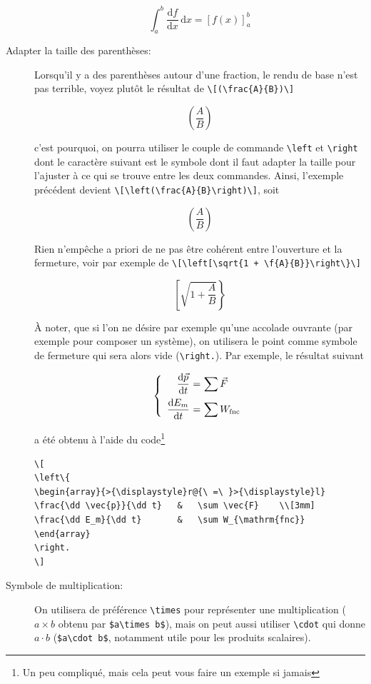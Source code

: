 \documentclass[12pt,a4paper]{article}
\newenvironment{code}{%
\begin{mdframed}[linecolor=Green,innerrightmargin=30pt,innerleftmargin=30pt,
backgroundcolor=Black!5,
skipabove=10pt,skipbelow=10pt,roundcorner=5pt,
splitbottomskip=6pt,splittopskip=12pt]
}{%
\end{mdframed}
}
\newcommand{\dd}{\text{d}}
\newcommand{\cmd}[1]{\texttt{\textbackslash#1}}
\begin{document}
\begin{description}
   \[
   \int_a^b \frac{\dd f}{\dd x}\,\dd x = [f(x)]_a^b
   \]
    
    \item[Adapter la taille des parenthèses:] Lorsqu'il y a des parenthèses autour d'une fraction, le rendu de base n'est pas terrible, voyez plutôt le résultat de \verb|\[(\frac{A}{B})\]|
    
    \[(\frac{A}{B})\]
    
    c'est pourquoi, on pourra utiliser le couple de commande \cmd{left} et \cmd{right} dont le caractère suivant est le symbole dont il faut adapter la taille pour l'ajuster à ce qui se trouve entre les deux commandes. Ainsi, l'exemple précédent devient \verb|\[\left(\frac{A}{B}\right)\]|, soit
    
      \[\left(\frac{A}{B}\right)\]
    
    Rien n'empêche a priori de ne pas être cohérent entre l'ouverture et la fermeture, voir par exemple de \verb|\[\left[\sqrt{1 + \f{A}{B}}\right\}\]|
    
    \[\left[\sqrt{1 + \frac{A}{B}}\right\}\]
    
    À noter, que si l'on ne désire par exemple qu'une accolade ouvrante (par exemple pour composer un système), on utilisera le point comme symbole de fermeture qui sera alors vide (\verb|\right.|). Par exemple, le résultat suivant
    
    \[\left\{
    \begin{array}{>{\displaystyle}r@{\ =\ }>{\displaystyle}l}
    \frac{\dd \vec{p}}{\dd t} 	& 	\sum \vec{F}	\\[3mm]
    \frac{\dd E_m}{\dd t}		&	\sum W_{\mathrm{fnc}}
    \end{array}
    \right.\]
    
    a été obtenu à l'aide du code\footnote{Un peu compliqué, mais cela peut vous faire un exemple si jamais}
    
\begin{code}
\begin{verbatim}
\[
\left\{
\begin{array}{>{\displaystyle}r@{\ =\ }>{\displaystyle}l}
\frac{\dd \vec{p}}{\dd t} 	& 	\sum \vec{F}	\\[3mm]
\frac{\dd E_m}{\dd t}		&	\sum W_{\mathrm{fnc}}
\end{array}
\right.
\]
\end{verbatim}
\end{code}
    
    \item[Symbole de multiplication:] On utilisera de préférence \cmd{times} pour représenter une multiplication ($a\times b$ obtenu par \verb|$a\times b$|), mais on peut aussi utiliser \cmd{cdot} qui donne $a\cdot b$ (\verb|$a\cdot b$|, notamment utile pour les produits scalaires).
\end{description}
\end{document}
